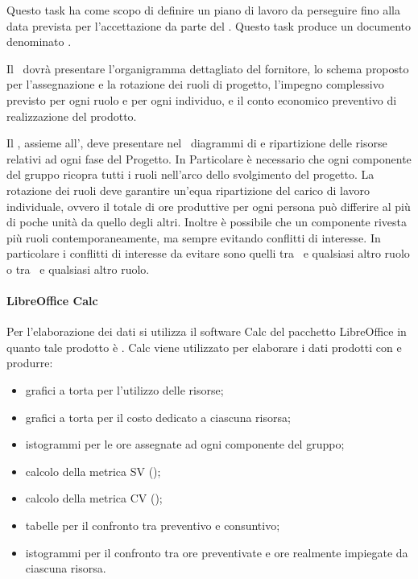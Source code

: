 \documentclass[12pt,a4paper]{article}
\begin{document}
Questo task ha come scopo di definire un piano di lavoro da perseguire fino alla data prevista per l'accettazione da parte del . Questo task produce un documento denominato \PdP.

Il \PdP\ dovrà presentare l'organigramma dettagliato del fornitore, lo schema proposto per l'assegnazione e la rotazione dei ruoli di progetto, l'impegno complessivo previsto per ogni ruolo e per ogni individuo, e il conto economico preventivo di realizzazione del prodotto.

Il \PM, assieme all'\AM, deve presentare nel \PdP\ diagrammi di  e ripartizione delle risorse relativi ad ogni fase del Progetto. In Particolare è necessario che ogni componente del gruppo ricopra tutti i ruoli nell'arco dello svolgimento del progetto. La rotazione dei ruoli deve garantire un'equa ripartizione del carico di lavoro individuale, ovvero il totale di ore produttive per ogni persona può differire al più di poche unità da quello degli altri. Inoltre è possibile che un componente rivesta più ruoli contemporaneamente, ma sempre evitando conflitti di interesse. In particolare i conflitti di interesse da evitare sono quelli tra \PM\ e qualsiasi altro ruolo o tra \VR\ e qualsiasi altro ruolo.


\paragraph{LibreOffice Calc}
Per l’elaborazione dei dati si utilizza il software Calc del pacchetto LibreOffice in quanto tale prodotto è . Calc viene utilizzato per elaborare i dati prodotti con  e produrre:
\begin{itemize}
	\item grafici a torta per l’utilizzo delle risorse;
	\item grafici a torta per il costo dedicato a ciascuna risorsa;
	\item istogrammi per le ore assegnate ad ogni componente del gruppo;
	\item calcolo della metrica SV ();
	\item calcolo della metrica CV ();
	\item tabelle per il confronto tra preventivo e consuntivo;
	\item istogrammi per il confronto tra ore preventivate e ore realmente impiegate da ciascuna risorsa.
\end{itemize}
\end{document}
